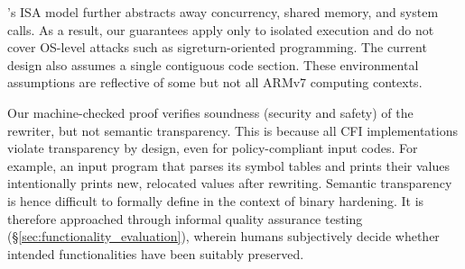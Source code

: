 \Picinae{}'s ISA model further abstracts away concurrency, shared memory, and system calls. As a result, our guarantees apply only to isolated execution and do not cover OS-level attacks such as sigreturn-oriented programming. The current design also assumes a single contiguous code section.
These environmental assumptions are reflective of some but not all ARMv7 computing contexts.




Our machine-checked proof verifies soundness (security and safety) of the rewriter, but not semantic transparency.
This is because all CFI implementations violate transparency by design, even for policy-compliant input codes.
For example, an input program that parses its symbol tables and prints their values intentionally prints new, relocated values after rewriting.
Semantic transparency is hence difficult to formally define in the context of binary hardening.
It is therefore approached through informal quality assurance testing (\S\ref{sec:functionality_evaluation}), wherein humans subjectively decide whether intended functionalities have been suitably preserved.

